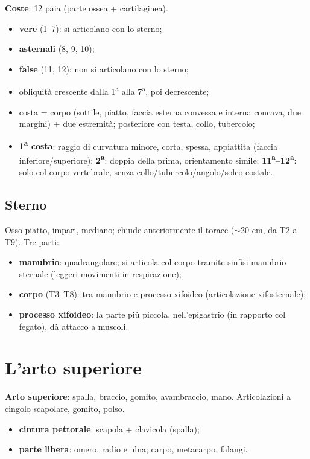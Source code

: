 \textbf{Coste}: 12 paia (parte ossea + cartilaginea).
\begin{itemize}
  \item \textbf{vere} (1--7): si articolano con lo sterno;
  \item \textbf{asternali} (8, 9, 10);
  \item \textbf{false} (11, 12): non si articolano con lo sterno;
  \item obliquità crescente dalla 1\textsuperscript{a} alla 7\textsuperscript{a}, poi decrescente;
  \item costa = corpo (sottile, piatto, faccia esterna convessa e interna concava, due margini) +
    due estremità; posteriore con testa, collo, tubercolo;
  \item \textbf{1\textsuperscript{a} costa}: raggio di curvatura minore, corta, spessa, appiattita
    (faccia inferiore/superiore); \textbf{2\textsuperscript{a}}: doppia della prima, orientamento
    simile; \textbf{11\textsuperscript{a}--12\textsuperscript{a}}: solo col corpo vertebrale, senza
    collo/tubercolo/angolo/solco costale.
\end{itemize}

\subsection{Sterno}
Osso piatto, impari, mediano; chiude anteriormente il torace ($\sim$20 cm, da T2 a T9). Tre parti:
\begin{itemize}
  \item \textbf{manubrio}: quadrangolare; si articola col corpo tramite sinfisi manubrio-sternale
    (leggeri movimenti in respirazione);
  \item \textbf{corpo} (T3--T8): tra manubrio e processo xifoideo (articolazione xifosternale);
  \item \textbf{processo xifoideo}: la parte più piccola, nell'epigastrio (in rapporto col fegato),
    dà attacco a muscoli.
\end{itemize}

\section{L'arto superiore}

\textbf{Arto superiore}: spalla, braccio, gomito, avambraccio, mano. Articolazioni a cingolo
scapolare, gomito, polso.
\begin{itemize}
  \item \textbf{cintura pettorale}: scapola + clavicola (spalla);
  \item \textbf{parte libera}: omero, radio e ulna; carpo, metacarpo, falangi.
\end{itemize}

